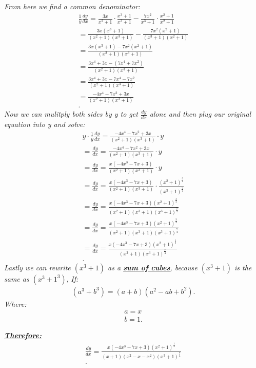 \documentclass{report}
\begin{document}
    \pagebreak \bigbreak \noindent
    \begin{mdframed}
        \textit{From here we find a common denominator:}
        \begin{align*}
            \frac{1}{y}\frac{dy}{dx} = \frac{3x}{x^{2}+1}\cdot \frac{x^{3}+1}{x^{3}+1} - \frac{7x^{2}}{x^{3}+1} \cdot \frac{x^{2}+1}{x^{2}+1} \\
            = \frac{3x(x^{3}+1)}{(x^{2}+1)(x^{3}+1)} - \frac{7x^{2}(x^{2}+1)}{(x^{3}+1)(x^{2}+1)} \\
            = \frac{3x(x^{3}+1)-7x^{2}(x^{2}+1)}{(x^{2}+1)(x^{3}+1)} \\
            = \frac{3x^{4}+3x -(7x^{4}+7x^{2})}{(x^{2}+1)(x^{3}+1)} \\
            = \frac{3x^{4}+3x -7x^{4}-7x^{2}}{(x^{2}+1)(x^{3}+1)} \\
            = \frac{-4x^{4}-7x^{2}+3x}{(x^{2}+1)(x^{3}+1)} \\
        .\end{align*}
        \bigbreak \noindent 
        \textit{Now we can mulitply both sides by y to get $\frac{dy}{dx}$ alone and then plug our original equation into y and solve:}
        \begin{align*}
           y \cdot \frac{1}{y} \frac{dy}{dx} = \frac{-4x^{4}-7x^{2}+3x}{(x^{2}+1)(x^{3}+1)} \cdot y \\
           = \frac{dy}{dx} = \frac{-4x^{4}-7x^{2}+3x}{(x^{2}+1)(x^{3}+1)} \cdot y \\
           = \frac{dy}{dx} = \frac{x(-4x^{3}-7x+3)}{(x^{2}+1)(x^{3}+1)} \cdot y \\
           = \frac{dy}{dx} = \frac{x(-4x^{3}-7x+3)}{(x^{2}+1)(x^{3}+1)} \cdot \frac{(x^{2}+1)^{\frac{3}{2}}}{(x^{3}+1)^{\frac{7}{4}}} \\
           = \frac{dy}{dx} = \frac{x(-4x^{3}-7x+3)(x^{2}+1)^{\frac{3}{2}}}{(x^{2}+1)(x^{3}+1)(x^{3}+1)^{\frac{7}{4}}}  \\
           = \frac{dy}{dx} = \frac{x(-4x^{3}-7x+3)(x^{2}+1)^{\frac{3}{2}}}{(x^{2}+1)(x^{3}+1)(x^{3}+1)^{\frac{7}{4}}} \\
           = \frac{dy}{dx} = \frac{x(-4x^{3}-7x+3)(x^{2}+1)^{\frac{1}{2}}}{(x^{3}+1)(x^{3}+1)^{\frac{7}{4}}} \\
       .\end{align*}
       \bigbreak \noindent 
       \textit{Lastly we can rewrite $(x^{3}+1)$ as a \textbf{\textit{\underline{sum of cubes}}}, because $(x^{3}+1)$ is the same as $(x^{3}+1^{3})$},
       \bigbreak \noindent 
       \textit{If:}
       \begin{align*}
           (a^{3}+b^{3}) = (a+b)(a^{2}-ab+b^{2})
       .\end{align*}
       \textit{Where:}
       \begin{align*}
           a = x \\
           b = 1
       .\end{align*}
    \end{mdframed}
    \pagebreak \bigbreak \noindent
    \begin{mdframed}
        \textbf{\textbf{\textit{\underline{Therefore:}}}}
        \begin{align*}
           \frac{dy}{dx} = \frac{x(-4x^{3}-7x+3)(x^{2}+1)^{\frac{1}{2}}}{(x+1)(x^{2}-x-x^{2})(x^{3}+1)^{\frac{7}{4}}} \\
        .\end{align*}
    \end{mdframed}
\end{document}
